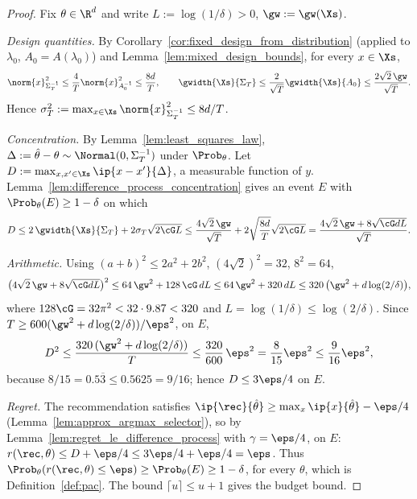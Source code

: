 \begin{proof}
Fix $\theta \in \R^d$ and write $L := \log(1/\delta) > 0$, $\gw := \gw(\Xs)$.

\emph{Design quantities.} By Corollary~\ref{cor:fixed_design_from_distribution} (applied to
$\lambda_0$, $A_0 = A(\lambda_0)$) and Lemma~\ref{lem:mixed_design_bounds}, for every $x \in \Xs$,
\[
  \norm{x}_{\Sigma_T^{-1}}^2 \le \frac4T\norm{x}_{A_0^{-1}}^2 \le \frac{8d}{T},
  \qquad
  \gwidth{\Xs}{\Sigma_T} \le \frac{2}{\sqrt T}\gwidth{\Xs}{A_0} \le \frac{2\sqrt2\,\gw}{\sqrt T} .
\]
Hence $\sigma_T^2 := \max_{x\in\Xs}\norm{x}_{\Sigma_T^{-1}}^2 \le 8d/T$.

\emph{Concentration.} By Lemma~\ref{lem:least_squares_law}, $\Delta := \hat\theta - \theta \sim
\Normal(0,\Sigma_T^{-1})$ under $\Prob_\theta$. Let $D := \max_{x,x'\in\Xs}\ip{x-x'}{\Delta}$, a
measurable function of $y$. Lemma~\ref{lem:difference_process_concentration} gives an event
$E$ with $\Prob_\theta(E) \ge 1-\delta$ on which
\[
  D \le 2\,\gwidth{\Xs}{\Sigma_T} + 2\sigma_T\sqrt{2\cG L}
  \le \frac{4\sqrt2\,\gw}{\sqrt T} + 2\sqrt{\frac{8d}{T}}\sqrt{2\cG L}
  = \frac{4\sqrt2\,\gw + 8\sqrt{\cG dL}}{\sqrt T} .
\]

\emph{Arithmetic.} Using $(a+b)^2 \le 2a^2 + 2b^2$, $(4\sqrt2)^2 = 32$, $8^2 = 64$,
\[
  \big(4\sqrt2\,\gw + 8\sqrt{\cG dL}\big)^2 \le 64\,\gw^2 + 128\,\cG\,dL
  \le 64\,\gw^2 + 320\,dL \le 320\,\big(\gw^2 + d\log(2/\delta)\big),
\]
where $128\cG = 32\pi^2 < 32\cdot 9.87 < 320$ and $L = \log(1/\delta) \le \log(2/\delta)$.
Since $T \ge 600(\gw^2 + d\log(2/\delta))/\eps^2$, on $E$,
\[
  D^2 \le \frac{320\,(\gw^2 + d\log(2/\delta))}{T} \le \frac{320}{600}\,\eps^2 = \frac{8}{15}\eps^2
  \le \frac{9}{16}\eps^2 ,
\]
because $8/15 = 0.5\overline{3} \le 0.5625 = 9/16$; hence $D \le 3\eps/4$ on $E$.

\emph{Regret.} The recommendation satisfies $\ip{\rec}{\hat\theta} \ge \max_x\ip{x}{\hat\theta} - \eps/4$
(Lemma~\ref{lem:approx_argmax_selector}), so by Lemma~\ref{lem:regret_le_difference_process}
with $\gamma = \eps/4$, on $E$: $r(\rec,\theta) \le D + \eps/4 \le 3\eps/4 + \eps/4 = \eps$.
Thus $\Prob_\theta(r(\rec,\theta) \le \eps) \ge \Prob_\theta(E) \ge 1 - \delta$, for every $\theta$,
which is Definition~\ref{def:pac}. The bound $\lceil u\rceil \le u + 1$ gives the budget bound.
\end{proof}

